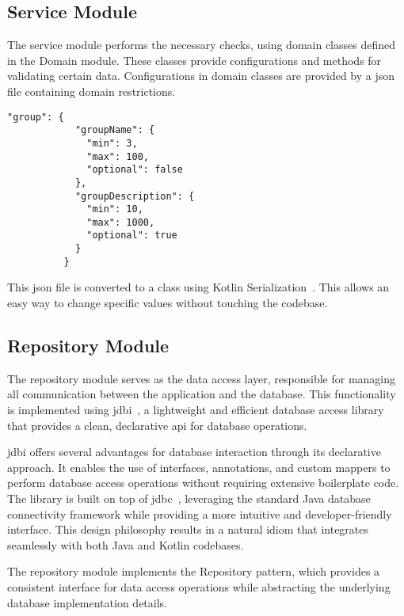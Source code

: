 \subsection*{Service Module}
The service module performs the necessary checks, using domain classes defined in the Domain module. These classes provide configurations and methods for validating certain data. Configurations in domain classes are provided by a \ac{json} file containing domain restrictions.

\begin{center}
    \begin{lstlisting}[caption={Example of the group entry}]
        "group": {
            "groupName": {
              "min": 3,
              "max": 100,
              "optional": false
            },
            "groupDescription": {
              "min": 10,
              "max": 1000,
              "optional": true
            }
          }
    \end{lstlisting}
\end{center}

This \ac{json} file is converted to a class using Kotlin Serialization~\cite{kotlin-serialization}. This allows an easy way to change specific values without touching the codebase.

\subsection*{Repository Module}
The repository module serves as the data access layer, responsible for managing all communication between the application and the database. This functionality is implemented using \ac{jdbi}~\cite{jdbi}, a lightweight and efficient database access library that provides a clean, declarative \acs{api} for database operations.

\ac{jdbi} offers several advantages for database interaction through its declarative approach. It enables the use of interfaces, annotations, and custom mappers to perform database access operations without requiring extensive boilerplate code. The library is built on top of \ac{jdbc}~\cite{jdbc}, leveraging the standard Java database connectivity framework while providing a more intuitive and developer-friendly interface. This design philosophy results in a natural idiom that integrates seamlessly with both Java and Kotlin codebases.

The repository module implements the Repository pattern, which provides a consistent interface for data access operations while abstracting the underlying database implementation details.

